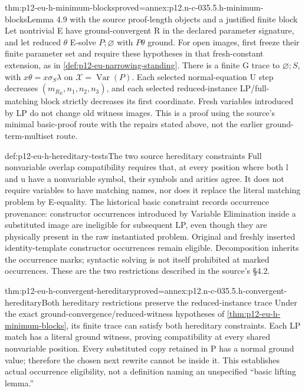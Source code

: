 \begin{hbtheorem}{thm:p12-eu-h-minimum-blocks}{proved=annex:p12.n-c-035.5.h-minimum-blocks}{Lemma 4.9 with the source proof-length objects and a justified finite block}
Let nontrivial E have ground-convergent R in the declared parameter
signature, and let reduced \(\theta\) E-solve
\(P;\varnothing\) with \(P\theta\) ground. For open images,
first freeze their finite parameter set and require these hypotheses
in that fresh-constant extension, as in
\cref{def:p12-eu-narrowing-standing}. There is a finite
G trace to \(\varnothing;S\), with
\(x\theta=x\sigma_S\lambda\) on
\(\mathcal X=\operatorname{Var}(P)\).
Each selected normal-equation U step decreases
\((m_{R_E},n_1,n_2,n_3)\), and each selected reduced-instance
LP/full-matching block strictly decreases its first coordinate.
Fresh variables introduced by LP do not change old witness images.
This is a proof using the source's minimal basic-proof route with
the repairs stated above, not the earlier ground-term-multiset route.
\cite[Lemma 4.9, pp.~491--492]{BaaderSnyder2001}
\end{hbtheorem}

\begin{hbdefinition}{def:p12-eu-h-hereditary-tests}{The two source hereditary constraints}
Full nonvariable overlap compatibility requires that, at every position
where both l and u have a nonvariable symbol, their symbols and arities
agree. It does not require variables to have matching names, nor does
it replace the literal matching problem by E-equality.
The historical basic constraint records occurrence provenance:
constructor occurrences introduced by Variable Elimination inside
a substituted image are ineligible for subsequent LP, even though
they are physically present in the raw instantiated problem. Original
and freshly inserted identity-template constructor occurrences remain
eligible. Decomposition inherits the occurrence marks; syntactic
solving is not itself prohibited at marked occurrences.
These are the two restrictions described in the source's \S4.2.
\cite[p.~495]{BaaderSnyder2001}
\end{hbdefinition}

\begin{hbtheorem}{thm:p12-eu-h-convergent-hereditary}{proved=annex:p12.n-c-035.5.h-convergent-hereditary}{Both hereditary restrictions preserve the reduced-instance trace}
Under the exact ground-convergence/reduced-witness hypotheses of
\cref{thm:p12-eu-h-minimum-blocks}, its finite trace can satisfy
both hereditary constraints. Each LP match has a literal ground
witness, proving compatibility at every shared nonvariable position.
Every substituted copy retained in P has a normal ground value;
therefore the chosen next rewrite cannot be inside it. This establishes
actual occurrence eligibility, not a definition naming an unspecified
``basic lifting lemma.''
\end{hbtheorem}

